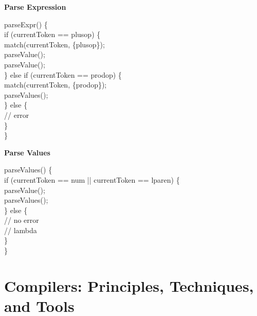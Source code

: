 \documentclass[letterpaper, 10pt,DIV=13]{scrartcl}
\numberwithin{equation}{section} %
\numberwithin{figure}{section} %
\numberwithin{table}{section} %
\begin{document}
\begin{enumerate}[label=\textbf{\Alph*}]
\textbf{Parse Expression} \\
\begin{algorithm}[H]
	\SetAlgoLined   
	parseExpr() \{ \\
		\Indp
		if (currentToken == plusop) \{ \\
			\Indp
			match(currentToken, \{plusop\}); \\
			parseValue(); \\
			parseValue(); \\
			\Indm		
		\} else if (currentToken == prodop) \{ \\
			\Indp
			match(currentToken, \{prodop\}); \\
			parseValues(); \\
			\Indm
		\} else \{ \\
			\Indp
			// error \\
			\Indm
		\} \\
		\Indm
	\} \\
\end{algorithm}

\textbf{Parse Values} \\
\begin{algorithm}[H]
	\SetAlgoLined   
	parseValues() \{ \\
		\Indp
		if (currentToken == num || currentToken == lparen) \{ \\
			\Indp
			parseValue(); \\
			parseValues(); \\
			\Indm		
		\} else \{ \\
			\Indp
			// no error \\
			// lambda \\
			\Indm
		\} \\
		\Indm
	\} \\
\end{algorithm}

\end{enumerate}

\pagebreak

\section*{Compilers: Principles, Techniques, and Tools}
\end{document}
